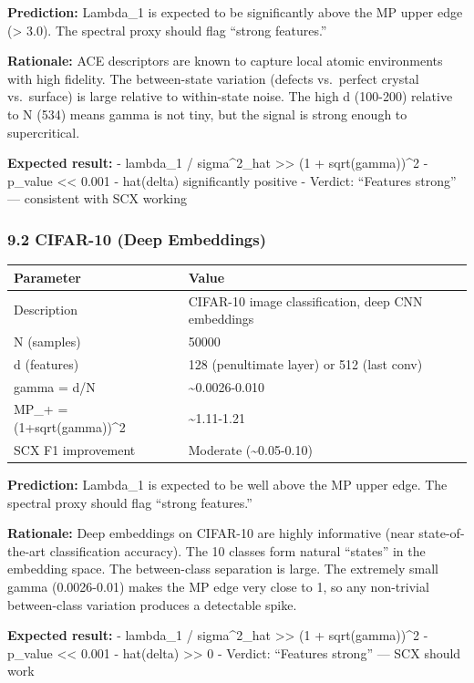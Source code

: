 \documentclass[
  12pt,
]{article}
\begin{document}
\textbf{Prediction:} Lambda\_1 is expected to be significantly above the
MP upper edge (\textgreater{} 3.0). The spectral proxy should flag
``strong features.''

\textbf{Rationale:} ACE descriptors are known to capture local atomic
environments with high fidelity. The between-state variation (defects
vs.~perfect crystal vs.~surface) is large relative to within-state
noise. The high d (100-200) relative to N (534) means gamma is not tiny,
but the signal is strong enough to supercritical.

\textbf{Expected result:} - lambda\_1 / sigma\^{}2\_hat
\textgreater\textgreater{} (1 + sqrt(gamma))\^{}2 - p\_value
\textless\textless{} 0.001 - hat(delta) significantly positive -
Verdict: ``Features strong'' --- consistent with SCX working

\subsubsection{9.2 CIFAR-10 (Deep
Embeddings)}\label{cifar-10-deep-embeddings}

\begin{longtable}[]{@{}ll@{}}
\toprule\noalign{}
Parameter & Value \\
\midrule\noalign{}
\endhead
\bottomrule\noalign{}
\endlastfoot
Description & CIFAR-10 image classification, deep CNN embeddings \\
N (samples) & 50000 \\
d (features) & 128 (penultimate layer) or 512 (last conv) \\
gamma = d/N & \textasciitilde0.0026-0.010 \\
MP\_+ = (1+sqrt(gamma))\^{}2 & \textasciitilde1.11-1.21 \\
SCX F1 improvement & Moderate (\textasciitilde0.05-0.10) \\
\end{longtable}

\textbf{Prediction:} Lambda\_1 is expected to be well above the MP upper
edge. The spectral proxy should flag ``strong features.''

\textbf{Rationale:} Deep embeddings on CIFAR-10 are highly informative
(near state-of-the-art classification accuracy). The 10 classes form
natural ``states'' in the embedding space. The between-class separation
is large. The extremely small gamma (0.0026-0.01) makes the MP edge very
close to 1, so any non-trivial between-class variation produces a
detectable spike.

\textbf{Expected result:} - lambda\_1 / sigma\^{}2\_hat
\textgreater\textgreater{} (1 + sqrt(gamma))\^{}2 - p\_value
\textless\textless{} 0.001 - hat(delta) \textgreater\textgreater{} 0 -
Verdict: ``Features strong'' --- SCX should work
\end{document}
